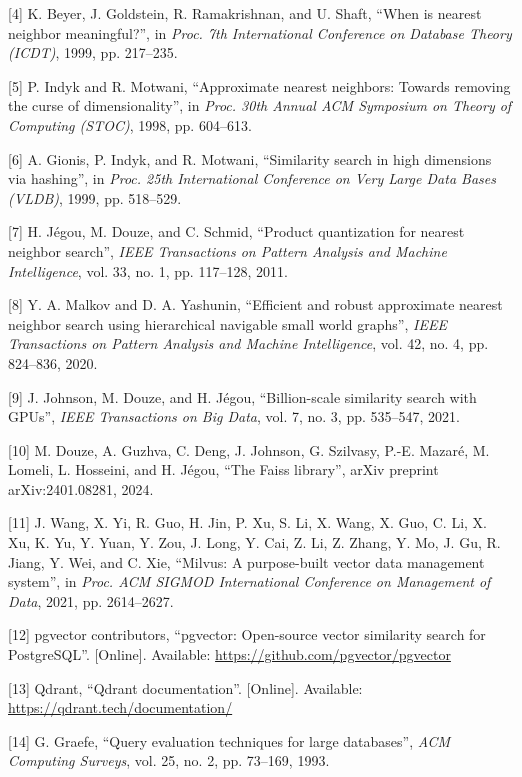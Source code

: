 \documentclass[11pt,a4paper]{article}
\begin{document}
{[}4{]} K. Beyer, J. Goldstein, R. Ramakrishnan, and U. Shaft, \enquote{When is
\textquotesingle nearest neighbor\textquotesingle{} meaningful?}, in
\emph{Proc. 7th International Conference on Database Theory (ICDT)},
1999, pp. 217--235.

{[}5{]} P. Indyk and R. Motwani, \enquote{Approximate nearest neighbors: Towards
removing the curse of dimensionality}, in \emph{Proc. 30th Annual ACM
Symposium on Theory of Computing (STOC)}, 1998, pp. 604--613.

{[}6{]} A. Gionis, P. Indyk, and R. Motwani, \enquote{Similarity search in high
dimensions via hashing}, in \emph{Proc. 25th International Conference on
Very Large Data Bases (VLDB)}, 1999, pp. 518--529.

{[}7{]} H. Jégou, M. Douze, and C. Schmid, \enquote{Product quantization for
nearest neighbor search}, \emph{IEEE Transactions on Pattern Analysis
and Machine Intelligence}, vol. 33, no. 1, pp. 117--128, 2011.

{[}8{]} Y. A. Malkov and D. A. Yashunin, \enquote{Efficient and robust
approximate nearest neighbor search using hierarchical navigable small
world graphs}, \emph{IEEE Transactions on Pattern Analysis and Machine
Intelligence}, vol. 42, no. 4, pp. 824--836, 2020.

{[}9{]} J. Johnson, M. Douze, and H. Jégou, \enquote{Billion-scale similarity
search with GPUs}, \emph{IEEE Transactions on Big Data}, vol. 7, no. 3,
pp. 535--547, 2021.

{[}10{]} M. Douze, A. Guzhva, C. Deng, J. Johnson, G. Szilvasy, P.-E.
Mazaré, M. Lomeli, L. Hosseini, and H. Jégou, \enquote{The Faiss library}, arXiv
preprint arXiv:2401.08281, 2024.

{[}11{]} J. Wang, X. Yi, R. Guo, H. Jin, P. Xu, S. Li, X. Wang, X. Guo,
C. Li, X. Xu, K. Yu, Y. Yuan, Y. Zou, J. Long, Y. Cai, Z. Li, Z. Zhang,
Y. Mo, J. Gu, R. Jiang, Y. Wei, and C. Xie, \enquote{Milvus: A purpose-built
vector data management system}, in \emph{Proc. ACM SIGMOD International
Conference on Management of Data}, 2021, pp. 2614--2627.

{[}12{]} pgvector contributors, \enquote{pgvector: Open-source vector similarity
search for PostgreSQL}. {[}Online{]}. Available:
\url{https://github.com/pgvector/pgvector}

{[}13{]} Qdrant, \enquote{Qdrant documentation}. {[}Online{]}. Available:
\url{https://qdrant.tech/documentation/}

{[}14{]} G. Graefe, \enquote{Query evaluation techniques for large databases},
\emph{ACM Computing Surveys}, vol. 25, no. 2, pp. 73--169, 1993.
\end{document}

